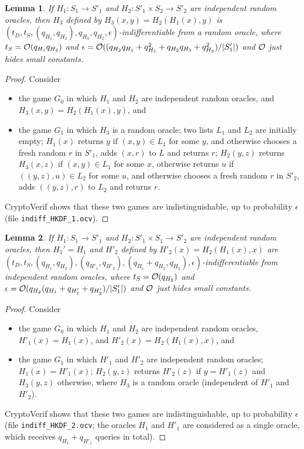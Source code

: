\documentclass[compsoc, conference, letterpaper, 10pt, times]{IEEEtran}
\newtheorem{lemma}{Lemma}
\begin{document}
\begin{lemma}\label{lem:hcomp1}
If $H_1 : S_1 \rightarrow S'_1$ and $H_2 : S'_1 \times S_2 \rightarrow S'_2$ 
are independent random oracles, then $H_3$ defined by $H_3(x,y) = H_2(H_1(x),y)$
is $(t_D, t_S, (q_{H_1}, q_{H_2}), q_{H_3}, q_{H_2}, \epsilon)$-indifferentiable from a random oracle, where $t_S = {\cal O}(q_{H_1} q_{H_2})$ and 
$\epsilon = {\cal O}((q_{H_2}q_{H_1} + q_{H_1}^2 + q_{H_2}q_{H_3} + q_{H_3}^2)/|S'_1|)$ and ${\cal O}$ just hides small constants.
\end{lemma}
\begin{proof}
Consider
\begin{itemize}[leftmargin=*]
\item  the game $G_0$ in which $H_1$ and $H_2$ are independent random oracles,
  and $H_3(x,y) = H_2(H_1(x),y)$, and
\item the game $G_1$ in which 
  $H_3$ is a random oracle;
  two lists $L_1$ and $L_2$ are initially empty;
  $H_1(x)$ returns $y$ if $(x,y) \in L_1$ for some $y$, 
  and otherwise chooses a fresh random $r$ in $S'_1$,
  adds $(x,r)$ to $L$ and returns $r$;
  $H_2(y,z)$ returns $H_3(x,z)$ if $(x,y) \in L_1$ for some $x$,
  otherwise returns $u$ if $((y,z),u) \in L_2$ for some $u$,
  and otherwise chooses a fresh random $r$ in $S'_2$,
  adds $((y,z),r)$ to $L_2$ and returns $r$.
\end{itemize}
CryptoVerif shows that these two games are indistinguishable,
up to probability $\epsilon$ (file \texttt{indiff\_HKDF\_1.ocv}).
\end{proof}

\begin{lemma}\label{lem:hcomp2}
If $H_1 : S_1 \rightarrow S'_1$ and $H_2 : S'_1 \times S_1 \rightarrow S'_2$ 
are independent random oracles, then $H_1' = H_1$ and $H'_2$ defined by 
$H'_2(x) = H_2(H_1(x),x)$ are $(t_D, t_S, (q_{H_1}, q_{H_2}), (q_{H'_1}, q_{H'_2}), (q_{H_1} + q_{H_2}, q_{H_2}), \epsilon)$-indifferentiable from independent random oracles, where $t_S = {\cal O}(q_{H_2})$ and 
$\epsilon = {\cal O}(q_{H_2}(q_{H_1}+q_{H'_1} + q_{H'_2})/|S'_1|)$ and ${\cal O}$ just hides small constants.
\end{lemma}
\begin{proof}
Consider
\begin{itemize}[leftmargin=*]
\item  the game $G_0$ in which $H_1$ and $H_2$ are independent random oracles,
  $H'_1(x) = H_1(x)$, and $H'_2(x) = H_2(H_1(x),x)$, and
\item the game $G_1$ in which 
  $H'_1$ and $H'_2$ are independent random oracles;
  $H_1(x) = H'_1(x)$;
  $H_2(y,z)$ returns $H'_2(z)$ if $y = H'_1(z)$ and $H_3(y,z)$ otherwise,
  where $H_3$ is a random oracle (independent of $H'_1$ and $H'_2$).
\end{itemize}
CryptoVerif shows that these two games are indistinguishable,
up to probability $\epsilon$ (file \texttt{indiff\_HKDF\_2.ocv};
the oracles $H_1$ and $H'_1$ are considered as a single oracle,
which receives $q_{H_1}+q_{H'_1}$ queries in total).
\end{proof}
\end{document}
